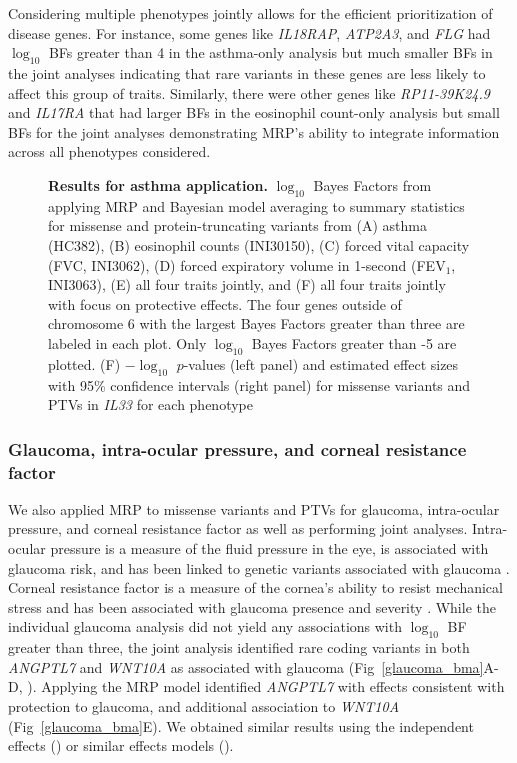 Considering multiple phenotypes jointly allows for the efficient prioritization of disease genes. For instance, some genes like \textit{IL18RAP}, \textit{ATP2A3}, and \textit{FLG} had $\log_{10}$ BFs greater than 4 in the asthma-only analysis but much smaller BFs in the joint analyses indicating that rare variants in these genes are less likely to affect this group of traits. Similarly, there were other genes like \textit{RP11-39K24.9} and \textit{IL17RA} that had larger BFs in the eosinophil count-only analysis but small BFs for the joint analyses demonstrating MRP's ability to integrate information across all phenotypes considered.

\begin{figure}[!h]
\caption{{\bf Results for asthma application.}
$\log_{10}$ Bayes Factors from applying MRP and Bayesian model averaging to summary statistics for missense and protein-truncating variants from (A) asthma (HC382), (B) eosinophil counts (INI30150), (C) forced vital capacity (FVC, INI3062), (D) forced expiratory volume in 1-second (FEV$_1$, INI3063), (E) all four traits jointly, and (F) all four traits jointly with focus on protective effects. The four genes outside of chromosome 6 with the largest Bayes Factors greater than three are labeled in each plot. Only $\log_{10}$ Bayes Factors greater than -5 are plotted. (F) $-\log_{10}$ $p$-values (left panel) and estimated effect sizes with 95\% confidence intervals (right panel) for missense variants and PTVs in \textit{IL33} for each phenotype}
\label{asthma_bma}
\end{figure}

\subsubsection*{Glaucoma, intra-ocular pressure, and corneal resistance factor}
We also applied MRP to missense variants and PTVs for glaucoma, intra-ocular pressure, and corneal resistance factor as well as performing joint analyses. Intra-ocular pressure is a measure of the fluid pressure in the eye, is associated with glaucoma risk, and has been linked to genetic variants associated with glaucoma \cite{doi:10.1001/jama.2014.3192}. Corneal resistance factor is a measure of the cornea's ability to resist mechanical stress and has been associated with glaucoma presence and severity \cite{CXO:CXO414, MANSOURI2012419, GriseDulac:2012bo}. While the individual glaucoma analysis did not yield any associations with $\log_{10}$ BF greater than three, the joint analysis identified rare coding variants in both \textit{ANGPTL7} and \textit{WNT10A} as associated with glaucoma (Fig~\ref{glaucoma_bma}A-D, ). Applying the MRP model identified \textit{ANGPTL7} with effects consistent with protection to glaucoma, and additional association to \textit{WNT10A} (Fig~\ref{glaucoma_bma}E). We obtained similar results using the independent effects () or similar effects models (). 

